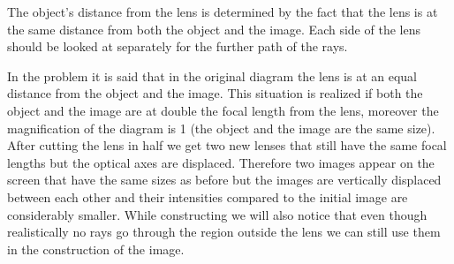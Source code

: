 {\begin{center}
\end{center}
\fi


\ifEngHint
The object's distance from the lens is determined by the fact that the lens is at the same distance from both the object and the image. Each side of the lens should be looked at separately for the further path of the rays.
\fi


\ifEngSolution
In the problem it is said that in the original diagram the lens is at an equal distance from the object and the image. This situation is realized if both the object and the image are at double the focal length from the lens, moreover the magnification of the diagram is 1 (the object and the image are the same size). After cutting the lens in half we get two new lenses that still have the same focal lengths but the optical axes are displaced. Therefore two images appear on the screen that have the same sizes as before but the images are vertically displaced between each other and their intensities compared to the initial image are considerably smaller. While constructing we will also notice that even though realistically no rays go through the region outside the lens we can still use them in the construction of the image.
\begin{center}

\end{center}}
